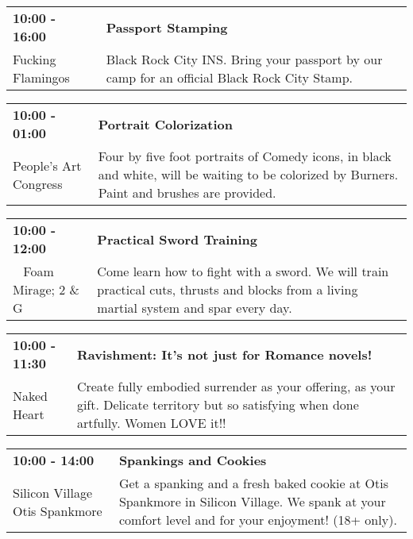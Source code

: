 \begin{tabular}{ p{1in} p{2.2in} }
    \textbf{10:00 - 16:00} & \textbf{Passport Stamping} \\
    Fucking Flamingos \newline  & Black Rock City INS. Bring your passport by our camp for an official Black Rock City Stamp. \\
    \hline 
\end{tabular}
    
\begin{tabular}{ p{1in} p{2.2in} }
    \textbf{10:00 - 01:00} & \textbf{Portrait Colorization} \\
    People's Art Congress \newline  & Four by five foot portraits of Comedy icons, in black and white, will be waiting to be colorized by Burners. Paint and brushes are provided. \\
    \hline 
\end{tabular}
    
\begin{tabular}{ p{1in} p{2.2in} }
    \textbf{10:00 - 12:00} & \textbf{Practical Sword Training} \\
    ~ \newline Foam Mirage; 2 \& G & Come learn how to fight with a sword. We will train practical cuts, thrusts and blocks from a living martial system and spar every day. \\
    \hline 
\end{tabular}
    
\begin{tabular}{ p{1in} p{2.2in} }
    \textbf{10:00 - 11:30} & \textbf{Ravishment: It's not just for Romance novels! } \\
    Naked Heart \newline  & Create fully embodied surrender as your offering, as your gift. Delicate territory but so satisfying when done artfully. Women LOVE it!! \\
    \hline 
\end{tabular}
    
\begin{tabular}{ p{1in} p{2.2in} }
    \textbf{10:00 - 14:00} & \textbf{Spankings and Cookies} \\
    Silicon Village \newline Otis Spankmore & Get a spanking and a fresh baked cookie at Otis Spankmore in Silicon Village. We spank at your comfort level and for your enjoyment! (18+ only). \\
    \hline 
\end{tabular}
    
